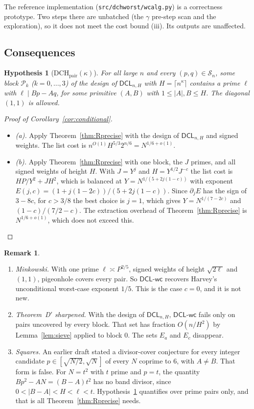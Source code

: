 \documentclass[11pt]{amsart}
\newtheorem{hypothesis}[theorem]{Hypothesis}
\theoremstyle{definition}
\newtheorem{remark}[theorem]{Remark}
\newcommand{\Sn}{\mathcal{S}_n}
\newcommand{\Pk}{\mathcal{P}_k}
\newcommand{\DCL}{\textsf{DCL}}
\newcommand{\DCLwc}{\textsf{DCL-wc}}
\begin{document}
The reference implementation (\texttt{src/dchworst/wcalg.py}) is a correctness prototype. Two
steps there are unbatched (the $\gamma$ pre-step scan and the exploration), so it does not meet
the cost bound (iii). Its outputs are unaffected.

\subsection{Consequences}

\begin{hypothesis}[$\mathrm{DCH}_{\mathrm{pair}}(\kappa)$]\label{hyp:DCHpair}
For all large $n$ and every $(p,q)\in\Sn$, some block $\Pk$ ($k=0,\dots,3$) of the design of
$\DCL_{n,H}$ with $H=\lceil n^\kappa\rceil$ contains a prime $\ell$ with $\ell\mid Bp-Aq$, for some
primitive $(A,B)$ with $1\le|A|,B\le H$. The diagonal $(1,1)$ is allowed.
\end{hypothesis}

\begin{proof}[Proof of Corollary~\ref{cor:conditional}]
\begin{itemize}
\item \emph{(a).} Apply Theorem~\ref{thm:Rprecise} with the design of $\DCL_{n,H}$ and signed
  weights. The list cost is $n^{O(1)}H^{5/3}2^{n/6}=N^{1/6+o(1)}$.
\item \emph{(b).} Apply Theorem~\ref{thm:Rprecise} with one block, the $J$ primes, and all
  signed weights of height $H$. With $J=Y^{j}$ and $H=Y^{1/2}J^{-c}$ the list cost is
  $HP/Y^2+JH^2$, which is balanced at $Y=N^{1/(5+2j(1-c))}$ with exponent
  $E(j,c)=(1+j(1-2c))/(5+2j(1-c))$. Since $\partial_jE$ has the sign of $3-8c$, for $c>3/8$ the
  best choice is $j=1$, which gives $Y=N^{1/(7-2c)}$ and $(1-c)/(7/2-c)$. The extraction overhead
  of Theorem~\ref{thm:Rprecise} is $N^{1/6+o(1)}$, which does not exceed this.
\end{itemize}
\end{proof}

\begin{remark}
\begin{enumerate}[label=(\alph*)]
\item \emph{Minkowski.} With one prime $\ell\asymp P^{2/5}$, signed weights of height
  $\sqrt{2\ell}$ and $(1,1)$, pigeonhole covers every pair. So $\DCLwc$ recovers Harvey's
  unconditional worst-case exponent $1/5$. This is the case $c=0$, and it is not new.
\item \emph{Theorem~D$'$ sharpened.} With the design of $\DCL_{n,H}$, $\DCLwc$ fails only on
  pairs uncovered by every block. That set has fraction $O(n/H^2)$ by Lemma~\ref{lem:sieve}
  applied to block $0$. The sets $E_a$ and $E_c$ disappear.
\item \emph{Squares.} An earlier draft stated a divisor-cover conjecture for every integer
  candidate $p\in[\sqrt{N/2},\sqrt N]$ of every $N$ coprime to $6$, with $A\ne B$. That form is
  false. For $N=t^2$ with $t$ prime and $p=t$, the quantity $Bp^2-AN=(B-A)t^2$ has no band
  divisor, since $0<|B-A|<H<\ell<t$. Hypothesis~\ref{hyp:DCHpair} quantifies over prime pairs
  only, and that is all Theorem~\ref{thm:Rprecise} needs.
\end{enumerate}
\end{remark}
\end{document}
